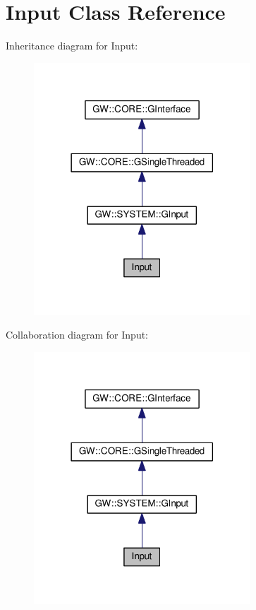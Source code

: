 \hypertarget{classInput}{}\section{Input Class Reference}
\label{classInput}


Inheritance diagram for Input\+:\nopagebreak
\begin{figure}[H]
\begin{center}
\leavevmode
\includegraphics[width=230pt]{classInput__inherit__graph}
\end{center}
\end{figure}


Collaboration diagram for Input\+:\nopagebreak
\begin{figure}[H]
\begin{center}
\leavevmode
\includegraphics[width=230pt]{classInput__coll__graph}
\end{center}
\end{figure}
